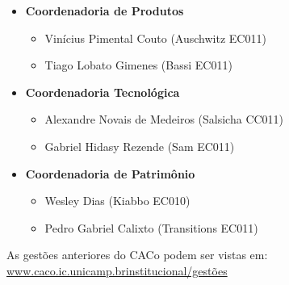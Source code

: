 \begin{itemize}
\item  \textbf{Coordenadoria de Produtos}
\begin{itemize}
\item Vinícius Pimental Couto (Auschwitz EC011)
\item Tiago Lobato Gimenes (Bassi EC011)
\end{itemize}
\end{itemize}

\begin{itemize}
\item  \textbf{Coordenadoria Tecnológica}
\begin{itemize}
\item Alexandre Novais de Medeiros (Salsicha CC011)
\item Gabriel Hidasy Rezende (Sam EC011)
\end{itemize}
\end{itemize}

\begin{itemize}
\item  \textbf{Coordenadoria de Patrimônio}
\begin{itemize}
\item Wesley Dias (Kiabbo EC010)
\item Pedro Gabriel Calixto (Transitions EC011)
\end{itemize}
\end{itemize}

As gestões anteriores do CACo podem ser vistas em:
\url{www.caco.ic.unicamp.brinstitucional/gestões}
